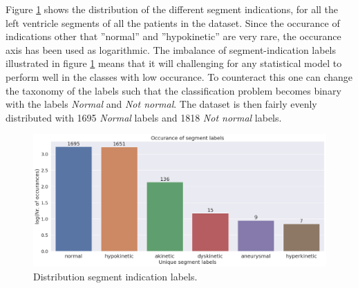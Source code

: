 \newpage

Figure \ref{fig:segm_label_dist} shows the distribution of the different segment indications, for all the left ventricle segments of all the patients in the dataset. 
Since the occurance of indications other that ''normal'' and ''hypokinetic'' are very rare, the occurance axis has been used as logarithmic. 
The imbalance of segment-indication labels illustrated in figure \ref{fig:segm_label_dist} means that it will challenging for any statistical model 
to perform well in the classes with low occurance. 
To counteract this one can change the taxonomy of the labels such that the classification problem becomes binary with the labels \textit{Normal} and \textit{Not normal}. 
The dataset is then fairly evenly distributed with 1695 \textit{Normal} labels and 1818 \textit{Not normal} labels. \bigskip

\begin{figure}[!h]
    \begin{center}
    \includegraphics[width=\textwidth]{data-exp/segment_label_distribution.png}
    \end{center}
    \caption{Distribution segment indication labels.}
    \label{fig:segm_label_dist}
\end{figure}


